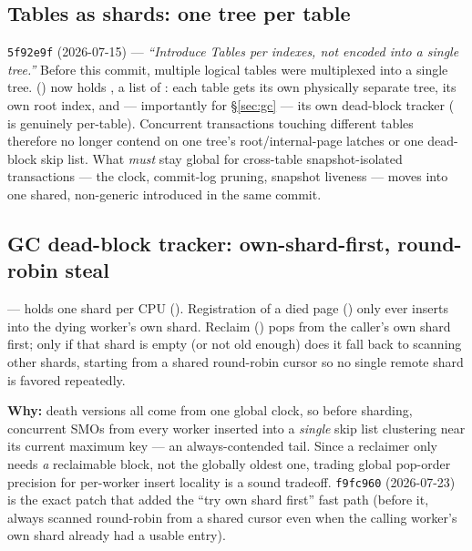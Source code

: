 \documentclass[11pt]{article}
\newcommand{\commit}[1]{\texttt{#1}}
\begin{document}
\subsection{Tables as shards: one tree per table}

\commit{5f92e9f} (2026-07-15) --- \emph{``Introduce Tables per indexes, not encoded into
a single tree.''} Before this commit, multiple logical tables were multiplexed into a
single tree.  () now holds
, a list of : each table gets its own physically separate tree, its own root
index, and --- importantly for \S\ref{sec:gc} --- its own dead-block tracker
( is genuinely per-table). Concurrent transactions touching
different tables therefore no longer contend on one tree's root/internal-page latches or
one dead-block skip list. What \emph{must} stay global for cross-table snapshot-isolated
transactions --- the clock, commit-log pruning, snapshot liveness --- moves into one
shared, non-generic  introduced in the same commit.

\subsection{GC dead-block tracker: own-shard-first, round-robin steal}

 ---  holds one 
shard per CPU (). Registration
of a died page () only ever inserts into the dying worker's own
shard. Reclaim () pops from the caller's own shard first; only if that
shard is empty (or not old enough) does it fall back to scanning other shards, starting
from a shared round-robin cursor so no single remote shard is favored repeatedly.

\textbf{Why:} death versions all come from one global clock, so before sharding,
concurrent SMOs from every worker inserted into a \emph{single} skip list clustering near
its current maximum key --- an always-contended tail. Since a reclaimer only needs
\emph{a} reclaimable block, not the globally oldest one, trading global pop-order
precision for per-worker insert locality is a sound tradeoff. \commit{f9fc960}
(2026-07-23) is the exact patch that added the ``try own shard first'' fast path (before
it,  always scanned round-robin from a shared cursor even when the
calling worker's own shard already had a usable entry).
\end{document}
